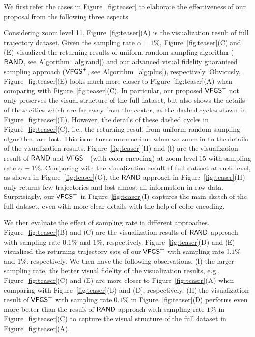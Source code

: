 We first refer the cases in Figure~\ref{fig:teaser} to elaborate the effectiveness of our proposal from the following three aspects.

Considering zoom level 11, Figure~\ref{fig:teaser}(A) is the visualization result of full \pt{} trajectory dataset.
Given the sampling rate $\alpha = 1\%$, Figure~\ref{fig:teaser}(C) and (E) visualized the returning results of uniform random sampling algorithm ($\mathsf{RAND}$, see Algorithm~\ref{alg:rand})
and our advanced visual fidelity guaranteed sampling approach ($\mathsf{VFGS}^{+}$, see Algorithm~\ref{alg:plus}), respectively.
Obviously, Figure~\ref{fig:teaser}(E) looks much more closer to Figure~\ref{fig:teaser}(A) when comparing with Figure~\ref{fig:teaser}(C).
In particular, our proposed $\mathsf{VFGS}^{+}$ not only preserves the visual structure of the full dataset,
but also shows the details of these cities which are far away from the center, as the dashed cycles shown in Figure~\ref{fig:teaser}(E).
However, the details of these dashed cycles in Figure~\ref{fig:teaser}(C), i.e., the returning result from uniform random sampling algorithm, are lost.
This issue turns more serious when we zoom in to the details of the visualization results.
Figure~\ref{fig:teaser}(H) and (I) are the visualization result of $\mathsf{RAND}$ and $\mathsf{VFGS}^{+}$  (with color encoding) at zoom level 15 with sampling rate $\alpha=1\%$.
Comparing with the visualization result of full dataset at such level, as shown in Figure~\ref{fig:teaser}(G),
the $\mathsf{RAND}{}$ approach in Figure~\ref{fig:teaser}(H) only returns few trajectories and lost almost all information in raw data.
Surprisingly, our $\mathsf{VFGS}^{+}$ in Figure~\ref{fig:teaser}(I) captures the main sketch of the full dataset, even with more clear details with the help of color encoding.

We then evaluate the effect of sampling rate in different approaches.
Figure~\ref{fig:teaser}(B) and (C) are the visualization results of $\mathsf{RAND}{}$ approach with sampling rate $0.1\%$ and $1\%$, respectively.
Figure~\ref{fig:teaser}(D) and (E) visualized the returning trajectory sets of our $\mathsf{VFGS}^{+}{}$ with sampling rate $0.1\%$ and $1\%$, respectively.
We then have the following observations.
(I) the larger sampling rate, the better visual fidelity of the visualization results, e.g.,
Figure~\ref{fig:teaser}(C) and (E) are more closer to Figure~\ref{fig:teaser}(A) when comparing with Figure~\ref{fig:teaser}(B) and (D), respectively.
(II) the visualization result of $\mathsf{VFGS}^{+}$ with sampling rate $0.1\%$ in Figure~\ref{fig:teaser}(D)
performs even more better than the result of $\mathsf{RAND}{}$ approach with sampling rate $1\%$ in Figure~\ref{fig:teaser}(C) to capture the visual structure of the full dataset in Figure~\ref{fig:teaser}(A).


